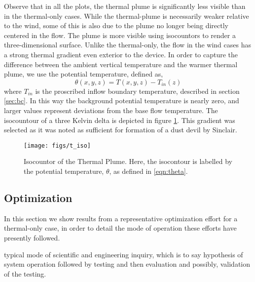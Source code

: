 Observe that in all the plots, the thermal plume is significantly less
visible than in the thermal-only cases. While the
thermal-plume is necessarily weaker relative to the wind, some of this
is also due to the plume no longer being directly centered in the
flow. The plume is more visible using isocountors to render a
three-dimensional surface. Unlike the thermal-only, the flow in the wind
cases has a strong thermal gradient even exterior to the device. In
order to capture the difference between the ambient vertical temperature
and the warmer thermal plume, we use the potential temperature, defined
as, 
\begin{equation}
  \theta(x,y,z) = T(x,y,z) -T_{in}(z) 
   \label{eqn:theta}
\end{equation}
where $T_{in}$ is the proscribed inflow boundary temperature, described
in section \ref{sec:bc}. In this way the background potential
temperature is nearly zero, and larger values represent deviations from
the base flow temperature. The isocountour of a three Kelvin delta is 
depicted in figure \ref{fig:field_real}. This gradient was selected as
it was noted as sufficient for formation of a dust devil by
Sinclair\cite{Sinclair1969}. 

%
%
  \begin{figure}[!htb]
   \begin{center}
    \texttt{[image: figs/t\_iso]}
    \caption{Isocountor of the Thermal Plume. Here, the isocontour is
    labelled by the potential temperature, $\theta$, as defined in \ref{eqn:theta}.}
    \label{fig:field_real}
   \end{center}
  \end{figure}

\subsection{Optimization}

In this section we show results from a representative optimization
effort for a thermal-only case, in order to detail the mode of operation
these efforts have presently followed. 

typical mode of scientific and engineering inquiry, which is to say
hypothesis of system operation followed by testing and then evaluation
and possibly, validation of the testing. 


